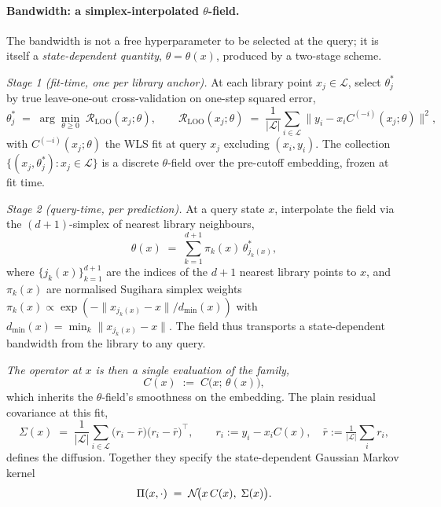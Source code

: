 \paragraph{Bandwidth: a simplex-interpolated \(\theta\)-field.}
The bandwidth is not a free hyperparameter to be selected at the
query; it is itself a \emph{state-dependent quantity},
\(\theta = \theta(x)\), produced by a two-stage scheme.

\emph{Stage 1 (fit-time, one per library anchor).}
At each library point \(x_j \in \mathcal{L}\), select \(\theta^{*}_j\)
by true leave-one-out cross-validation on one-step squared error,
\begin{equation}
\label{eq:loocv}
\theta^{*}_j \;=\;
\arg\min_{\theta \ge 0}\;
\mathcal{R}_{\mathrm{LOO}}(x_j;\theta), \qquad
\mathcal{R}_{\mathrm{LOO}}(x_j;\theta)
\;=\; \frac{1}{|\mathcal{L}|}
\sum_{i \in \mathcal{L}}
\bigl\lVert y_i - x_i C^{(-i)}(x_j;\theta) \bigr\rVert^{2},
\end{equation}
with \(C^{(-i)}(x_j;\theta)\) the WLS fit at query \(x_j\) excluding
\((x_i, y_i)\). The collection
\(\{(x_j, \theta^{*}_j) : x_j \in \mathcal{L}\}\) is a discrete
\(\theta\)-field over the pre-cutoff embedding, frozen at fit time.

\emph{Stage 2 (query-time, per prediction).}
At a query state \(x\), interpolate the field via the
\((d+1)\)-simplex of nearest library neighbours,
\begin{equation}
\label{eq:simplextheta}
\theta(x) \;=\; \sum_{k=1}^{d+1} \pi_k(x)\, \theta^{*}_{j_k(x)},
\end{equation}
where \(\{j_k(x)\}_{k=1}^{d+1}\) are the indices of the \(d+1\) nearest
library points to \(x\), and \(\pi_k(x)\) are normalised Sugihara
simplex weights
\(\pi_k(x) \propto \exp(-\lVert x_{j_k(x)} - x\rVert / d_{\min}(x))\)
with \(d_{\min}(x) = \min_k \lVert x_{j_k(x)} - x\rVert\). The
field thus transports a state-dependent bandwidth from the library to
any query.

\emph{The operator at \(x\) is then a single evaluation of the
family,}
\begin{equation}
\label{eq:Cofx}
C(x) \;:=\; C\bigl(x;\,\theta(x)\bigr),
\end{equation}
which inherits the \(\theta\)-field's smoothness on the embedding.
The plain residual covariance at this fit,
\begin{equation}
\label{eq:diff}
\Sigma(x) \;=\; \frac{1}{|\mathcal{L}|}
\sum_{i \in \mathcal{L}} \bigl(r_i - \bar r\bigr)
\bigl(r_i - \bar r\bigr)^{\!\top},
\qquad r_i := y_i - x_i C(x),
\quad \bar r := \tfrac{1}{|\mathcal{L}|}\sum_i r_i,
\end{equation}
defines the diffusion. Together they specify the state-dependent
Gaussian Markov kernel
\begin{equation}
\label{eq:kernel}
\Pi(x, \cdot) \;=\; \mathcal{N}\!\bigl(x \, C(x),\; \Sigma(x)\bigr).
\end{equation}

